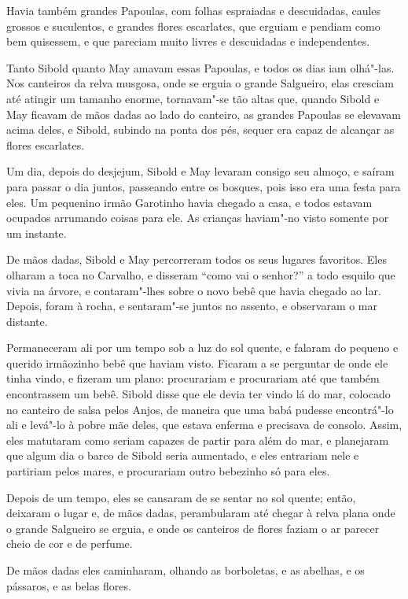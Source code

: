 Havia também grandes Papoulas, com folhas espraiadas e descuidadas,
caules grossos e suculentos, e grandes flores escarlates, que erguiam e
pendiam como bem quisessem, e que pareciam muito livres e descuidadas e
independentes.

Tanto Sibold quanto May amavam essas Papoulas, e todos os dias iam
olhá"-las. Nos canteiros da relva musgosa, onde se erguia o grande
Salgueiro, elas cresciam até atingir um tamanho enorme, tornavam"-se tão
altas que, quando Sibold e May ficavam de mãos dadas ao lado do
canteiro, as grandes Papoulas se elevavam acima deles, e Sibold, subindo
na ponta dos pés, sequer era capaz de alcançar as flores escarlates.

Um dia, depois do desjejum, Sibold e May levaram consigo seu almoço, e
saíram para passar o dia juntos, passeando entre os bosques, pois isso
era uma festa para eles. Um pequenino irmão Garotinho havia chegado a
casa, e todos estavam ocupados arrumando coisas para ele. As crianças
haviam"-no visto somente por um instante.

De mãos dadas, Sibold e May percorreram todos os seus lugares favoritos.
Eles olharam a toca no Carvalho, e disseram ``como vai o senhor?'' a todo
esquilo que vivia na árvore, e contaram"-lhes sobre o novo bebê que havia
chegado ao lar. Depois, foram à rocha, e sentaram"-se juntos no assento,
e observaram o mar distante.

Permaneceram ali por um tempo sob a luz do sol quente, e falaram do
pequeno e querido irmãozinho bebê que haviam visto. Ficaram a se
perguntar de onde ele tinha vindo, e fizeram um plano: procurariam e
procurariam até que também encontrassem um bebê. Sibold disse que
ele devia ter vindo lá do mar, colocado no canteiro de salsa pelos
Anjos, de maneira que uma babá pudesse encontrá"-lo ali e levá"-lo à pobre
mãe deles, que estava enferma e precisava de consolo. Assim, eles
matutaram como seriam capazes de partir para além do mar, e planejaram
que algum dia o barco de Sibold seria aumentado, e eles entrariam nele e
partiriam pelos mares, e procurariam outro bebezinho só para eles.

Depois de um tempo, eles se cansaram de se sentar no sol quente; então,
deixaram o lugar e, de mãos dadas, perambularam até chegar à relva plana
onde o grande Salgueiro se erguia, e onde os canteiros de flores faziam
o ar parecer cheio de cor e de perfume.

De mãos dadas eles caminharam, olhando as borboletas, e as abelhas, e os
pássaros, e as belas flores.

